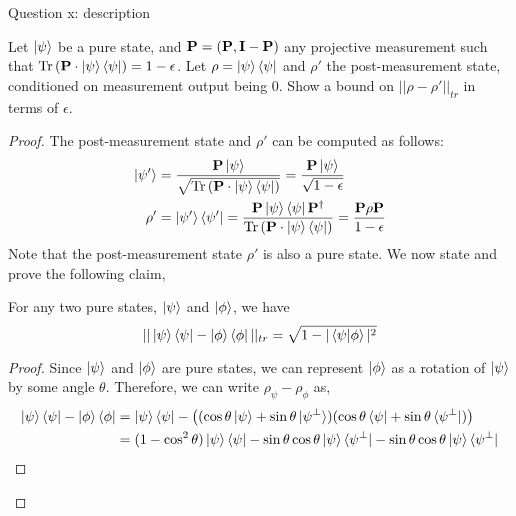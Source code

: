 \begin{solution}{Question x: description}\label{ques:x}
    \begin{question}
        Let $\ket{\psi}$ be a pure state, and $\mathbf{P} = (\mathbf{P}, \mathbf{I} - \mathbf{P})$ any projective measurement such that $\mathrm{Tr}\left( \mathbf{P}\cdot\ket{\psi}\bra{\psi} \right) = 1 - \epsilon$. Let $\rho = \ket{\psi}\bra{\psi}$ and $\rho'$ the post-measurement state, conditioned on measurement output being $0$. Show a bound on $||\rho - \rho'||_{tr}$ in terms of $\epsilon$.
    \end{question}
    \tcblower{}
    \begin{proof}
        The post-measurement state and $\rho'$ can be computed as follows:
        \begin{equation}
            \begin{split}
                \ket{\psi'} &= \frac{\mathbf{P}\ket{\psi}}{\sqrt{\mathrm{Tr}\left( \mathbf{P}\cdot\ket{\psi}\bra{\psi} \right)}} = \frac{\mathbf{P}\ket{\psi}}{\sqrt{1-\epsilon}}\\
                \rho' &= \ket{\psi'}\bra{\psi'} = \frac{\mathbf{P}\ket{\psi}\bra{\psi}\mathbf{P}^\dagger}{\mathrm{Tr}\left( \mathbf{P}\cdot\ket{\psi}\bra{\psi} \right)} = \frac{\mathbf{P}\rho\mathbf{P}}{1-\epsilon}
            \end{split}
        \end{equation}
        Note that the post-measurement state $\rho'$ is also a pure state. We now state and prove the following claim,
        \begin{claim}
            For any two pure states, $\ket{\psi}$ and $\ket{\phi}$, we have
            \begin{equation}
                ||\ket{\psi}\bra{\psi} - \ket{\phi}\bra{\phi}||_{tr} = \sqrt{1 - |\braket{\psi|\phi}|^2}
            \end{equation}
        \end{claim}
        \begin{proof}
            Since $\ket{\psi}$ and $\ket{\phi}$ are pure states, we can represent $\ket{\phi}$ as a rotation of $\ket{\psi}$ by some angle $\theta$. Therefore, we can write $\rho_{\psi} - \rho_{\phi}$ as,
            \begin{equation}
                \begin{split}
                    \ketbra{\psi} - \ketbra{\phi} &= \ketbra{\psi} - \left((\cos\theta\ket{\psi} + \sin\theta\ket{\psi^\perp})(\cos\theta\bra{\psi} + \sin\theta\bra{\psi^\perp})\right)\\
                    &= (1-\cos^2\theta)\ketbra{\psi} - \sin\theta\cos\theta\ketbraa{\psi}{\psi^\perp} - \sin\theta\cos\theta\ketbraa{\psi}{\psi^\perp}\\

\end{split}
\end{equation}
\end{proof}
\end{proof}
\end{solution}
